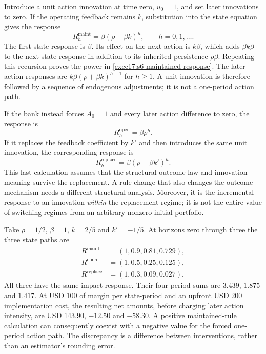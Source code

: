 Introduce a unit action innovation at time zero, $u_0=1$, and set later
innovations to zero. If the operating feedback remains $k$, substitution
into the state equation gives the response
\begin{equation}
 R_h^{\mathrm{maint}}=\beta(\rho+\beta k)^h,
 \qquad h=0,1,\ldots.
 \label{exec17:s6-maintained-response}
\end{equation}
The first state response is $\beta$. Its effect on the next action is
$k\beta$, which adds $\beta k\beta$ to the next state response in
addition to its inherited persistence $\rho\beta$. Repeating this
recursion proves the power in \eqref{exec17:s6-maintained-response}.
The later action responses are $k\beta(\rho+\beta k)^{h-1}$ for
$h\geq1$. A unit innovation is therefore followed by a sequence of
endogenous adjustments; it is not a one-period action path.

If the bank instead forces $A_0=1$ and every later action difference to
zero, the response is
\begin{equation}
 R_h^{\mathrm{open}}=\beta\rho^h.
 \label{exec17:s6-open-response}
\end{equation}
If it replaces the feedback coefficient by $k'$ and then introduces the
same unit innovation, the corresponding response is
\begin{equation}
 R_h^{\mathrm{replace}}=\beta(\rho+\beta k')^h.
 \label{exec17:s6-replacement-response}
\end{equation}
This last calculation assumes that the structural outcome law and innovation
meaning survive the replacement. A rule change that also changes the outcome
mechanism needs a different structural analysis. Moreover, it is the
incremental response to an innovation \emph{within} the replacement regime;
it is not the entire value of switching regimes from an arbitrary nonzero
initial portfolio.

Take $\rho=1/2$, $\beta=1$, $k=2/5$ and $k'=-1/5$. At horizons
zero through three the three state paths are
\begin{align}
 R^{\mathrm{maint}}&=(1,0.9,0.81,0.729),\nonumber\\
 R^{\mathrm{open}}&=(1,0.5,0.25,0.125),\nonumber\\
 R^{\mathrm{replace}}&=(1,0.3,0.09,0.027).
 \label{exec17:s6-feedback-paths}
\end{align}
All three have the same impact response. Their four-period sums are
$3.439$, $1.875$ and $1.417$. At USD 100 of margin per state-period
and an upfront USD 200 implementation cost, the resulting net amounts,
before charging later action intensity, are USD 143.90, $-12.50$ and
$-58.30$. A positive maintained-rule calculation can consequently coexist
with a negative value for the forced one-period action path. The discrepancy
is a difference between interventions, rather than an estimator's rounding
error.~\citep{exec17_s6_math}

